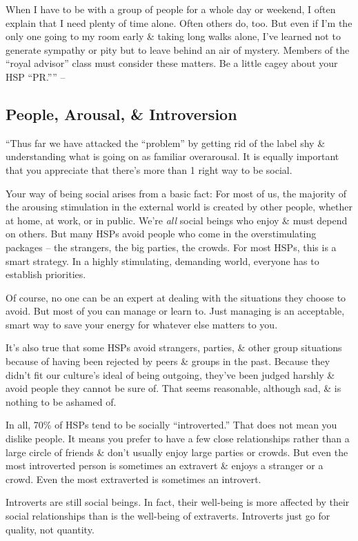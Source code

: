 \documentclass{article}
\numberwithin{equation}{section}
\begin{document}
When I have to be with a group of people for a whole day or weekend, I often explain that I need plenty of time alone. Often others do, too. But even if I'm the only one going to my room early \& taking long walks alone, I've learned not to generate sympathy or pity but to leave behind an air of mystery. Members of the ``royal advisor'' class must consider these matters. Be a little cagey about your HSP ``PR.'''' -- \cite[pp. 127--129]{Aron2013}

\subsection{People, Arousal, \& Introversion}
``Thus far we have attacked the ``problem'' by getting rid of the label shy \& understanding what is going on as familiar overarousal. It is equally important that you appreciate that there's more than 1 right way to be social.

Your way of being social arises from a basic fact: For most of us, the majority of the arousing stimulation in the external world is created by other people, whether at home, at work, or in public. We're \textit{all} social beings who enjoy \& must depend on others. But many HSPs avoid people who come in the overstimulating packages -- the strangers, the big parties, the crowds. For most HSPs, this is a smart strategy. In a highly stimulating, demanding world, everyone has to establish priorities.

Of course, no one can be an expert at dealing with the situations they choose to avoid. But most of you can manage or learn to. Just managing is an acceptable, smart way to save your energy for whatever else matters to you.

It's also true that some HSPs avoid strangers, parties, \& other group situations because of having been rejected by peers \& groups in the past. Because they didn't fit our culture's ideal of being outgoing, they've been judged harshly \& avoid people they cannot be sure of. That seems reasonable, although sad, \& is nothing to be ashamed of.

In all, 70\% of HSPs tend to be socially ``introverted.'' That does not mean you dislike people. It means you prefer to have a few close relationships rather than a large circle of friends \& don't usually enjoy large parties or crowds. But even the most introverted person is sometimes an extravert \& enjoys a stranger or a crowd. Even the most extraverted is sometimes an introvert.

Introverts are still social beings. In fact, their well-being is more affected by their social relationships than is the well-being of extraverts. Introverts just go for quality, not quantity.
\end{document}
